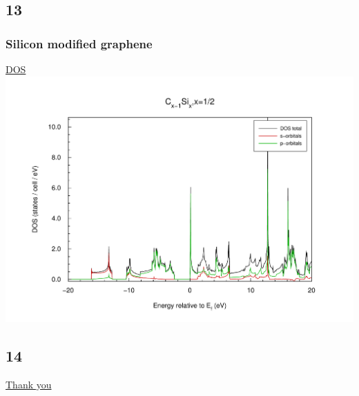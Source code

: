 \documentclass{beamer}
\begin{document}
	\subsection*{13}
		\begin{frame}
			\frametitle{Silicon modified graphene}
			\underline{DOS}
			\includegraphics[width=\textwidth]{figures/Silicon1R/dos.pdf}
		\end{frame}
	
	\subsection*{14}
		\begin{frame}
			\vspace{2cm}
			\centering
			\underline{Thank you}
		\end{frame}
\end{document}
